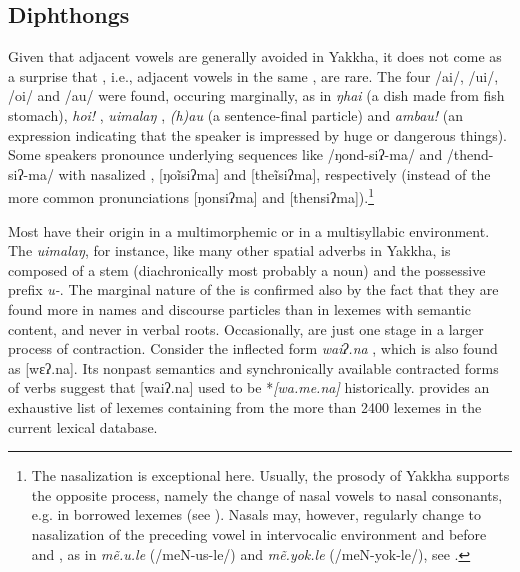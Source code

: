 \subsection{Diphthongs}\label{diphth}

Given that adjacent vowels are generally avoided in Yakkha, it does not come as a surprise that , i.e., adjacent vowels in the same , are rare. The four  /ai/, /ui/, /oi/ and /au/ were found, occuring marginally, as in \emph{ŋhai} (a dish made from fish stomach), \emph{hoi!} ,  \emph{uimalaŋ} , \emph{(h)au} (a sentence-final  particle) and \emph{ambau!} (an   expression indicating that the speaker is impressed by huge or dangerous things). Some speakers pronounce underlying sequences like /ŋond-siʔ-ma/ and /thend-siʔ-ma/ with nasalized , [ŋoĩsiʔma] and [theĩsiʔma], respectively (instead of the more common pronunciations [ŋonsiʔma] and [thensiʔma]).\footnote{The nasalization is exceptional here. Usually, the prosody of Yakkha supports the opposite process, namely the change of nasal vowels to nasal consonants, e.g. in borrowed  lexemes (see ). Nasals may, however, regularly change to nasalization of the preceding vowel in intervocalic environment and before  and , as in \emph{mẽ.u.le}  (/meN-us-le/) and \emph{mẽ.yok.le}  (/meN-yok-le/), see .} 

Most  have their origin in a multimorphemic or in a multisyllabic environment. The  \emph{uimalaŋ}, for instance, like many other spatial adverbs in Yakkha, is composed of a stem (diachronically most probably a noun) and the possessive prefix \emph{u-}. The marginal nature of the  is confirmed also by the fact  that they are found more in names and discourse particles than in lexemes with semantic content, and never in verbal roots. Occasionally,  are just one stage in a larger process of contraction. Consider the inflected form \emph{waiʔ.na} , which is also found as [wɛʔ.na]. Its nonpast semantics and synchronically available contracted forms of verbs suggest that [waiʔ.na]  used to be *\emph{[wa.me.na] } historically.  provides an exhaustive list of lexemes containing  from the more than 2400 lexemes in the current lexical database.



